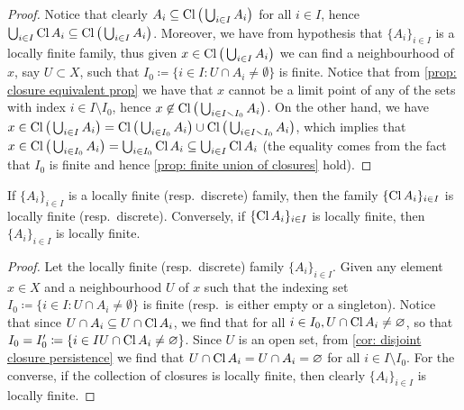 \begin{proof}
    Notice that clearly \(A_i \subseteq \operatorname{Cl}\big(\bigcup_{i \in I} A_i\big)\) for all
    \(i \in I\), hence
    \(\bigcup_{i \in I} \operatorname{Cl} A_i \subseteq \operatorname{Cl}\big(\bigcup_{i \in I}
    A_i\big)\). Moreover, we have from hypothesis that \(\{A_i\}_{i \in I}\) is a
    locally finite family, thus given \(x \in \operatorname{Cl}\big(\bigcup_{i \in I} A_i\big)\)
    we can find a neighbourhood of \(x\), say \(U \subset X\), such that
    \(I_0 \coloneq \{i \in I \colon U \cap A_i \neq \emptyset\}\) is finite. Notice
    that from \cref{prop: closure equivalent prop} we have that \(x\) cannot be a
    limit point of any of the sets with index \(i \in I \setminus I_0\), hence
    \(x \not\in \operatorname{Cl}\big(\bigcup_{i \in I \smallsetminus I_0} A_i\big)\). On the other
    hand, we have
    \(x \in \operatorname{Cl}\big(\bigcup_{i \in I} A_i\big) = \operatorname{Cl}\big(\bigcup_{i \in I_0}
    A_i\big) \cup \operatorname{Cl}\big(\bigcup_{i \in I \smallsetminus I_0} A_i\big)\), which implies
    that
    \(x \in \operatorname{Cl}\big(\bigcup_{i \in I_0} A_i\big) = \bigcup_{i \in I_0} \operatorname{Cl} A_i
    \subseteq \bigcup_{i \in I} \operatorname{Cl} A_i\) (the equality comes from the fact
    that \(I_0\) is finite and hence \cref{prop: finite union of closures} hold).
\end{proof}

\begin{proposition}
    If \(\{A_i\}_{i \in I}\) is a locally finite (resp.\ discrete) family, then the
    family \(\{\operatorname{Cl} A_i\}_{i \in I}\) is locally finite (resp.\ discrete). Conversely,
    if \(\{\operatorname{Cl} A_i\}_{i \in I}\) is locally finite, then \(\{A_i\}_{i \in I}\) is
    locally finite.
\end{proposition}

\begin{proof}
    Let the locally finite (resp.\ discrete) family \(\{A_i\}_{i \in I}\). Given any
    element \(x \in X\) and a neighbourhood \(U\) of \(x\) such that the indexing
    set \(I_0 \coloneq \{i \in I \colon U \cap A_i \neq \emptyset\}\) is finite
    (resp.\ is either empty or a singleton). Notice that since
    \(U \cap A_i \subseteq U \cap \operatorname{Cl} A_i\), we find that for all
    \(i \in I_0, U \cap \operatorname{Cl} A_i \neq \varnothing\), so that
    \(I_0 = I_0' \coloneq \{i \in I \relax U \cap \operatorname{Cl} A_i \neq \varnothing\}\). Since
    \(U\) is an open set, from \cref{cor: disjoint closure persistence} we find that
    \(U \cap \operatorname{Cl} A_i = U \cap A_i = \varnothing\) for all \(i \in I \setminus
    I_0\). For the converse, if the collection of closures is locally finite, then
    clearly \(\{A_{i}\}_{i \in I}\) is locally finite.
\end{proof}

